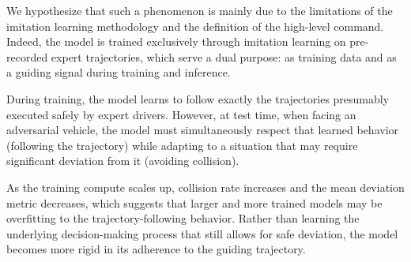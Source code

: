 We hypothesize that such a phenomenon is mainly due to the limitations of the imitation learning methodology and the definition of the high-level command. Indeed, the model is trained exclusively through imitation learning on pre-recorded expert trajectories, which serve a dual purpose: as training data and as a guiding signal during training and inference.

During training, the model learns to follow exactly the trajectories presumably executed safely by expert drivers. However, at test time, when facing an adversarial vehicle, the model must simultaneously respect that learned behavior (following the trajectory) while adapting to a situation that may require significant deviation from it (avoiding collision).

As the training compute scales up, collision rate increases and the mean deviation metric decreases, which suggests that larger and more trained models may be overfitting to the trajectory-following behavior. Rather than learning the underlying decision-making process that still allows for safe deviation, the model becomes more rigid in its adherence to the guiding trajectory. 



